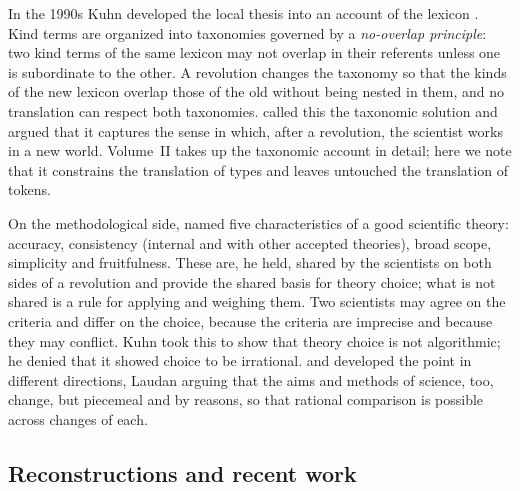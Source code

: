 \documentclass{situationist-preprint}
\begin{document}
In the 1990s Kuhn developed the local thesis into an account of the lexicon \citep{Kuhn1991,Kuhn1993}. Kind terms are organized into taxonomies governed by a \emph{no-overlap principle}: two kind terms of the same lexicon may not overlap in their referents unless one is subordinate to the other. A revolution changes the taxonomy so that the kinds of the new lexicon overlap those of the old without being nested in them, and no translation can respect both taxonomies. \citet{Hacking1993} called this the taxonomic solution and argued that it captures the sense in which, after a revolution, the scientist works in a new world. Volume~II takes up the taxonomic account in detail; here we note that it constrains the translation of types and leaves untouched the translation of tokens.

On the methodological side, \citet{Kuhn1977} named five characteristics of a good scientific theory: accuracy, consistency (internal and with other accepted theories), broad scope, simplicity and fruitfulness. These are, he held, shared by the scientists on both sides of a revolution and provide the shared basis for theory choice; what is not shared is a rule for applying and weighing them. Two scientists may agree on the criteria and differ on the choice, because the criteria are imprecise and because they may conflict. Kuhn took this to show that theory choice is not algorithmic; he denied that it showed choice to be irrational. \citet{McMullin1983} and \citet{Laudan1984} developed the point in different directions, Laudan arguing that the aims and methods of science, too, change, but piecemeal and by reasons, so that rational comparison is possible across changes of each.

\subsection{Reconstructions and recent work}
\end{document}
